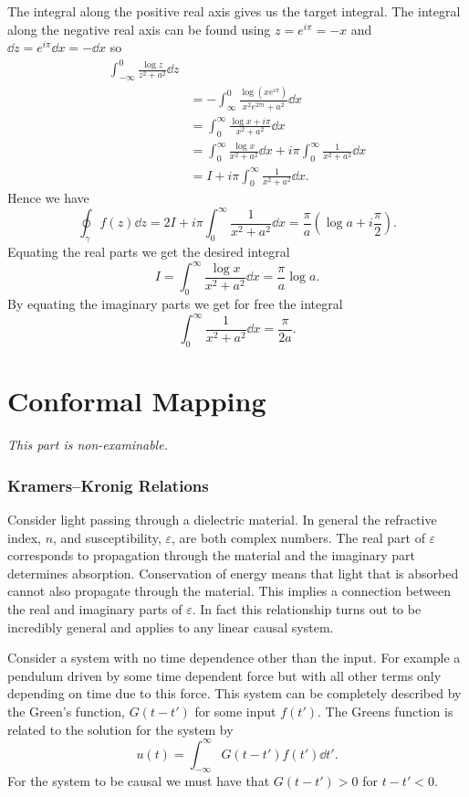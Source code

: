 \documentclass{article}
\begin{document}
\begin{example}
        The integral along the positive real axis gives us the target integral.
        The integral along the negative real axis can be found using \(z = e^{i\pi} = -x\) and \(\dd{z} = e^{i\pi}\dd{x} = -\dd{x}\) so
        \begin{align*}
            \int_{-\infty}^{0} \frac{\log z}{z^2 + a^2} \dd{z}\\
            &= -\int_{\infty}^{0} \frac{\log(x e^{i\pi})}{x^2e^{2\pi i} + a^2}\dd{x}\\
            &= \int_{0}^{\infty} \frac{\log x + i\pi}{x^2 + a^2}\dd{x}\\
            &= \int_{0}^{\infty} \frac{\log x}{x^2 + a^2} \dd{x} + i\pi \int_{0}^{\infty} \frac{1}{x^2 + a^2} \dd{x}\\
            &= I + i\pi\int_{0}^{\infty} \frac{1}{x^2 + a^2}\dd{x}.
        \end{align*}
        Hence we have
        \[\oint_{\gamma} f(z)\dd{z} = 2I + i\pi \int_{0}^{\infty} \frac{1}{x^2 + a^2} \dd{x} = \frac{\pi}{a}\left( \log a + i\frac{\pi}{2} \right).\]
        Equating the real parts we get the desired integral
        \[I = \int_{0}^{\infty} \frac{\log x}{x^2 + a^2} \dd{x} = \frac{\pi}{a}\log a.\]
        By equating the imaginary parts we get for free the integral
        \[\int_{0}^{\infty} \frac{1}{x^2 + a^2} \dd{x} = \frac{\pi}{2a}.\]
    \end{example}
    
    \part{Conformal Mapping}
    \textit{This part is non-examinable.}
    \section{Kramers--Kronig Relations}
    Consider light passing through a dielectric material.
    In general the refractive index, \(n\), and susceptibility, \(\varepsilon\), are both complex numbers.
    The real part of \(\varepsilon\) corresponds to propagation through the material and the imaginary part determines absorption.
    Conservation of energy means that light that is absorbed cannot also propagate through the material.
    This implies a connection between the real and imaginary parts of \(\varepsilon\).
    In fact this relationship turns out to be incredibly general and applies to any linear causal system.
    
    Consider a system with no time dependence other than the input.
    For example a pendulum driven by some time dependent force but with all other terms only depending on time due to this force.
    This system can be completely described by the Green's function, \(G(t - t')\) for some input \(f(t')\).
    The Greens function is related to the solution for the system by
    \[u(t) = \int_{-\infty}^{\infty} G(t - t')f(t') \dd{t'}.\]
    For the system to be causal we must have that \(G(t - t') > 0\) for \(t - t' < 0\).
    
\end{document}
